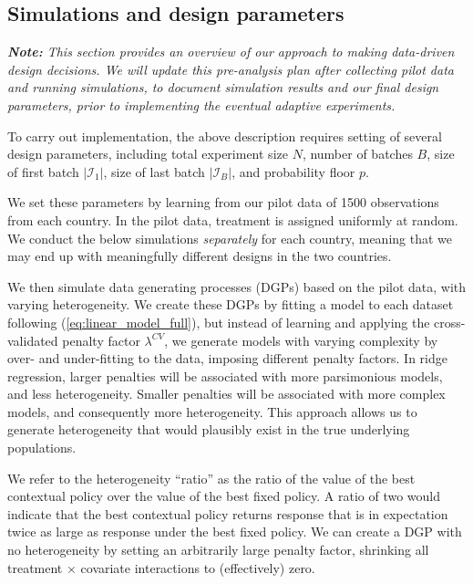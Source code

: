 \documentclass[letterpaper, 12pt, parskip=full,]{scrartcl}
\begin{document}
\subsection{Simulations and design parameters}\label{simulations}

\textit{\textbf{Note:} This section provides an overview of our approach to making data-driven design decisions. We will update this pre-analysis plan \textit{after} collecting pilot data and running simulations, to document simulation results and our final design parameters, prior to implementing the eventual adaptive experiments. }

To carry out implementation, the above description requires setting of several design parameters, including total experiment size $N$, number of batches $B$,  size of first batch $|\mathcal{I}_1|$, size of last batch $|\mathcal{I}_B|$, and probability floor $p$. 

We set these parameters by learning from our pilot data of 1500 observations from each country. In the pilot data, treatment is assigned uniformly at random. We conduct the below simulations \textit{separately} for each country, meaning that we may end up with meaningfully different designs in the two countries. 

We then simulate data generating processes (DGPs) based on the pilot data, with varying heterogeneity. We create these DGPs by fitting a model to each dataset following (\ref{eq:linear_model_full}),  but instead of learning and applying the cross-validated penalty factor $\lambda^{CV}$, we generate models with varying complexity by over- and under-fitting to the data, imposing different penalty factors. In ridge regression, larger penalties will be associated with more parsimonious models, and less heterogeneity. Smaller penalties will be associated with more complex models, and consequently more heterogeneity. This approach allows us to generate heterogeneity that would plausibly exist in the true underlying populations. 

We refer to the heterogeneity ``ratio'' as the ratio of the value of the best contextual policy over the value of the best fixed policy. A ratio of two would indicate that the best contextual policy returns response that is in expectation twice as large as response under the best fixed policy. We can create a DGP with no heterogeneity by setting an arbitrarily large penalty factor, shrinking all treatment $\times$ covariate interactions to (effectively) zero. 
\end{document}
